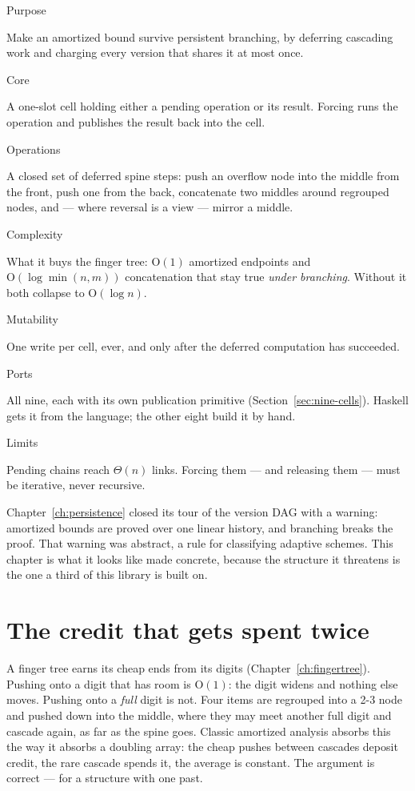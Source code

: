 \documentclass[11pt,twoside,openright]{book}
\newcommand{\bigoh}[1]{$\mathrm{O}(#1)$}
\newcommand{\spec}[2]{%
  \par\noindent
  \parbox[t]{0.21\linewidth}{\raggedright\sffamily\bfseries\footnotesize
    \color{d7slate}\strut #1}%
  \hspace{9pt}%
  \parbox[t]{\dimexpr0.79\linewidth-9pt\relax}{\raggedright\strut #2}%
  \par\vspace{3.5pt}}
\newenvironment{specimen}[1][Specimen]
  {\begin{glancebox}[#1]\small\setlength{\parindent}{0pt}}
  {\end{glancebox}}
\begin{document}
\begin{specimen}[Specimen --- the memoized suspension]
%
\spec{Purpose}{Make an amortized bound survive persistent branching, by deferring cascading work and charging every version that shares it at most once.}
\spec{Core}{A one-slot cell holding either a pending operation or its result. Forcing runs the operation and publishes the result back into the cell.}
\spec{Operations}{A closed set of deferred spine steps: push an overflow node into the middle from the front, push one from the back, concatenate two middles around regrouped nodes, and --- where reversal is a view --- mirror a middle.}
\spec{Complexity}{What it buys the finger tree: \bigoh{1} amortized endpoints and \bigoh{\log \min(n,m)} concatenation that stay true \emph{under branching}. Without it both collapse to \bigoh{\log n}.}
\spec{Mutability}{One write per cell, ever, and only after the deferred computation has succeeded.}
\spec{Ports}{All nine, each with its own publication primitive (Section~\ref{sec:nine-cells}). Haskell gets it from the language; the other eight build it by hand.}
\spec{Limits}{Pending chains reach $\Theta(n)$ links. Forcing them --- and releasing them --- must be iterative, never recursive.}
\end{specimen}

\noindent
Chapter~\ref{ch:persistence} closed its tour of the version DAG with a warning:
amortized bounds are proved over one linear history, and branching breaks the
proof. That warning was abstract, a rule for classifying adaptive schemes. This
chapter is what it looks like made concrete, because the structure it threatens
is the one a third of this library is built on.

\section{The credit that gets spent twice}

A finger tree earns its cheap ends from its digits (Chapter~\ref{ch:fingertree}).
Pushing onto a digit that has room is \bigoh{1}: the digit widens and nothing
else moves. Pushing onto a \emph{full} digit is not. Four items are regrouped
into a 2-3 node and pushed down into the middle, where they may meet another
full digit and cascade again, as far as the spine goes. Classic amortized
analysis absorbs this the way it absorbs a doubling array: the cheap pushes
between cascades deposit credit, the rare cascade spends it, the average is
constant. The argument is correct --- for a structure with one past.
\end{document}
